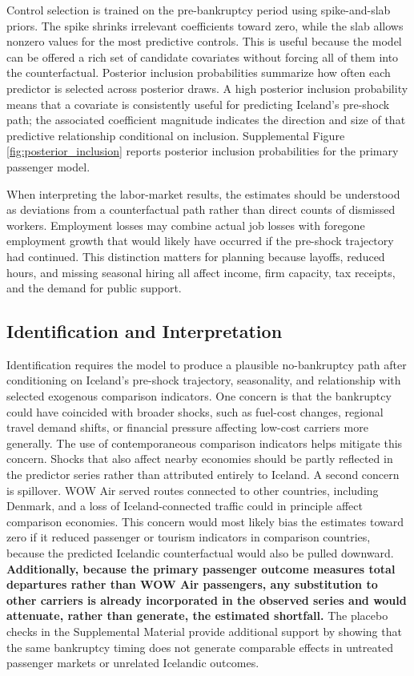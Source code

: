 \documentclass[12pt]{article}
\begin{document}
Control selection is trained on the pre-bankruptcy period using spike-and-slab priors. The spike shrinks irrelevant coefficients toward zero, while the slab allows nonzero values for the most predictive controls. This is useful because the model can be offered a rich set of candidate covariates without forcing all of them into the counterfactual. Posterior inclusion probabilities summarize how often each predictor is selected across posterior draws. A high posterior inclusion probability means that a covariate is consistently useful for predicting Iceland's pre-shock path; the associated coefficient magnitude indicates the direction and size of that predictive relationship conditional on inclusion. Supplemental Figure \ref{fig:posterior_inclusion} reports posterior inclusion probabilities for the primary passenger model.

When interpreting the labor-market results, the estimates should be understood as deviations from a counterfactual path rather than direct counts of dismissed workers. Employment losses may combine actual job losses with foregone employment growth that would likely have occurred if the pre-shock trajectory had continued. This distinction matters for planning because layoffs, reduced hours, and missing seasonal hiring all affect income, firm capacity, tax receipts, and the demand for public support.\subsection{Identification and Interpretation}\label{sec:identification}

Identification requires the model to produce a plausible no-bankruptcy path after conditioning on Iceland's pre-shock trajectory, seasonality, and relationship with selected exogenous comparison indicators. One concern is that the bankruptcy could have coincided with broader shocks, such as fuel-cost changes, regional travel demand shifts, or financial pressure affecting low-cost carriers more generally. The use of contemporaneous comparison indicators helps mitigate this concern. Shocks that also affect nearby economies should be partly reflected in the predictor series rather than attributed entirely to Iceland. A second concern is spillover. WOW Air served routes connected to other countries, including Denmark, and a loss of Iceland-connected traffic could in principle affect comparison economies. This concern would most likely bias the estimates toward zero if it reduced passenger or tourism indicators in comparison countries, because the predicted Icelandic counterfactual would also be pulled downward. \textbf{Additionally, because the primary passenger outcome measures total departures rather than WOW Air passengers, any substitution to other carriers is already incorporated in the observed series and would attenuate, rather than generate, the estimated shortfall.} The placebo checks in the Supplemental Material provide additional support by showing that the same bankruptcy timing does not generate comparable effects in untreated passenger markets or unrelated Icelandic outcomes.
\end{document}
